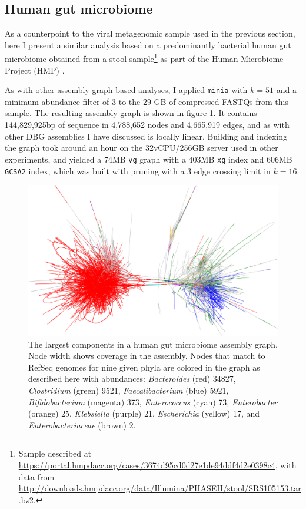 \documentclass[a4paper,12pt,numbered,oneside]{Classes/PhDThesisPSnPDF}
\begin{document}
\subsection{Human gut microbiome}

As a counterpoint to the viral metagenomic sample used in the previous section, here I present a similar analysis based on a predominantly bacterial human gut microbiome obtained from a stool sample\footnote{Sample described at \url{https://portal.hmpdacc.org/cases/3674d95cd0d27e1de94ddf4d2e0398c4}, with data from \url{http://downloads.hmpdacc.org/data/Illumina/PHASEII/stool/SRS105153.tar.bz2}.} as part of the Human Microbiome Project (HMP) \cite{turnbaugh2007human,peterson2009nih}.

As with other assembly graph based analyses, I applied {\tt minia} with $k=51$ and a minimum abundance filter of 3 to the 29 GB of compressed FASTQs from this sample.
The resulting assembly graph is shown in figure \ref{fig:human_gut_microbiome_bandage}.
It contains 144,829,925bp of sequence in 4,788,652 nodes and 4,665,919 edges, and as with other DBG assemblies I have discussed is locally linear.
Building and indexing the graph took around an hour on the 32vCPU/256GB server used in other experiments, and yielded a 74MB {\tt vg} graph with a 403MB {\tt xg} index and 606MB {\tt GCSA2} index, which was built with pruning with a 3 edge crossing limit in $k=16$.

\begin{figure}[htbp!]
  \centering
  \includegraphics[width=1.0\textwidth]{Chapter3/Figs/human_gut_microbiome_phyla_colored_full_between.png}
  \caption[A human gut microbiome]{
    The largest components in a human gut microbiome assembly graph.
    Node width shows coverage in the assembly.
    Nodes that match to RefSeq genomes for nine given phyla are colored in the graph as described here with abundances: \emph{Bacteroides} (red) 34827, \emph{Clostridium} (green) 9521, \emph{Faecalibacterium} (blue) 5921, \emph{Bifidobacterium} (magenta) 373, \emph{Enterococcus} (cyan) 73, \emph{Enterobacter} (orange) 25, \emph{Klebsiella} (purple) 21, \emph{Escherichia} (yellow) 17, and \emph{Enterobacteriaceae} (brown) 2.
  }
  \label{fig:human_gut_microbiome_bandage}
\end{figure}
\end{document}
